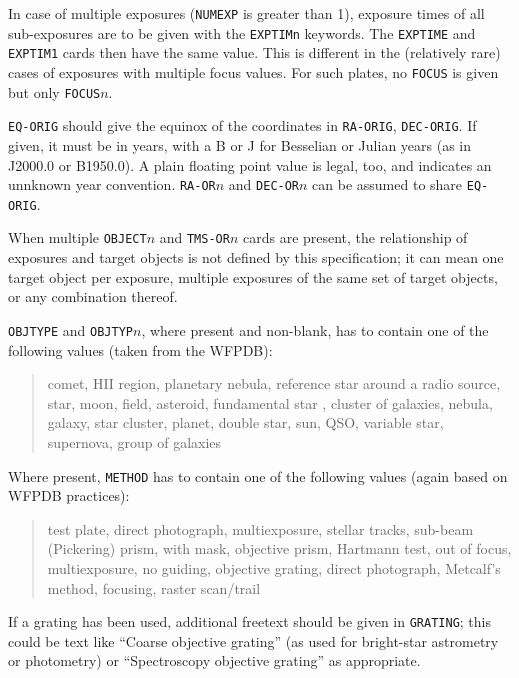 \documentclass[11pt]{ivoa}
\newcommand\cardname[1]{\texttt{\color{keyword}#1}}
\begin{document}
In case of multiple exposures (\cardname{NUMEXP} is greater than 1),
exposure times of all sub-exposures are to be given with the
\cardname{EXPTIMn} keywords.  The \cardname{EXPTIME} and
\cardname{EXPTIM1} cards then have the same value.  This is different in
the (relatively rare) cases of exposures with multiple focus values.
For such plates, no \cardname{FOCUS} is given but only
\cardname{FOCUS$n$}.

\cardname{EQ-ORIG} should give the equinox of the coordinates in
\cardname{RA-ORIG}, \cardname{DEC-ORIG}.  If given, it must be in
years, with a B or J for Besselian or Julian years (as in J2000.0 or
B1950.0).  A plain floating point value is legal, too, and indicates
an unnknown year convention.  \cardname{RA-OR$n$} and
\cardname{DEC-OR$n$} can be assumed to share \cardname{EQ-ORIG}.

When multiple \cardname{OBJECT$n$} and \cardname{TMS-OR$n$} cards are
present, the relationship of exposures and target objects is not defined
by this specification; it can mean one target object per exposure,
multiple exposures of the same set of target objects, or any combination
thereof.

\cardname{OBJTYPE} and \cardname{OBJTYP$n$}, where present and
non-blank, has to contain one of the following values (taken from the
WFPDB):

\begin{quotation}
\noindent comet, HII region, planetary nebula, reference star around a radio
source, star, moon, field, asteroid, fundamental star
, cluster of galaxies, nebula, galaxy, star cluster, planet, double
star, sun, QSO, variable star, supernova, group of galaxies
\end{quotation}

Where present, \cardname{METHOD} has to contain one of the following
values (again based on WFPDB practices):

\begin{quotation}
\noindent test plate, direct photograph, multiexposure, stellar tracks, sub-beam
(Pickering) prism, with mask, objective prism, Hartmann test, out of
focus, multiexposure, no guiding, objective grating,
direct photograph, Metcalf's method, focusing, raster scan/trail
\end{quotation}

If a grating has been used, additional freetext should be given in
\cardname{GRATING}; this could be text like  ``Coarse objective
grating'' (as used for bright-star astrometry or photometry) or ``Spectroscopy
objective grating'' as appropriate.
\end{document}
